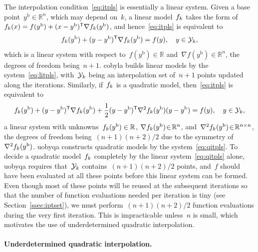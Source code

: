 \documentclass[
    smallextended,  %
    final,        %
]{svjour3}
\newcommand{\R}{\mathbb{R}}
\newcommand{\T}{\mathsf{T}}
\newcommand{\base}{{\text{b}}}
\newcommand{\objm}[1][k]{\obj\ifthenelse{\equal{#1}{}}{}{_{#1}}}
\newcommand{\obj}{f}
\newcommand{\xpt}[1][k]{\mathcal{Y}\ifthenelse{\equal{#1}{}}{}{_{#1}}}
\begin{document}
The interpolation condition~\eqref{eq:itpls} is essentially a linear system.
Given a base point~$y^{\base}\in \R^n$, which may depend on~$k$, a linear model~$\objm$ takes the
form of~$\objm(x) = \obj(y^{\base}) + (x - y^{\base})^{\T} \nabla \objm(y^{\base})$, and
hence~\eqref{eq:itpls} is equivalent to
\begin{equation}
    \label{eq:litpls}
    \objm(y^{\base}) + (y -y^{\base})^{\T} \nabla \objm(y^{\base})  = \obj(y),  \quad y \in \xpt,
\end{equation}
which is a linear system with respect to~$\obj(y^\base) \in \R$ and~$\nabla \obj(y^\base) \in \R^n$, the degrees of freedom being~$n+1$.
\Gls{cobyla} builds linear models by the system~\eqref{eq:litpls}, with~$\xpt$ being an interpolation
set of~$n+1$ points updated along the iterations.
Similarly, if~$\objm$ is a quadratic model, then~\eqref{eq:itpls} is equivalent to
\begin{equation}
    \label{eq:qitpls}
    \objm(y^{\base}) + (y -y^{\base})^{\T} \nabla \objm(y^{\base})
    + \frac{1}{2}(y-y^{\base})^{\T}  \nabla^2 \objm(y^{\base}) (y-y^{\base}) = \obj(y),  \quad y \in \xpt,
\end{equation}
a linear system with unknowns~$\objm(y^\base) \in \R$, $\nabla \objm(y^\base) \!\in\! \R^n$,
and~$\nabla^2 \objm(y^{\base})\!\in\!\R^{n \times n}$, the degrees of freedom being~$(n + 1)(n + 2) / 2$ due to the symmetry of~$\nabla^2 \objm(y^\base)$.
\Gls{uobyqa} constructs quadratic models by the system~\eqref{eq:qitpls}.
To decide a quadratic model~$\objm$ completely by the linear system~\eqref{eq:qitpls} alone,
\gls{uobyqa} requires that~$\xpt$ contains~$(n+1)(n+2)/2$ points, and~$f$ should have been evaluated at all these points before this linear system can be formed.
Even though most of these points will be reused at the subsequent iterations so that the number of
function evaluations needed per iteration is tiny (see Section~\ref{ssec:iptset}), we must perform~$(n + 1)(n + 2) / 2$ function evaluations during the very first iteration.
This is impracticable unless~$n$ is small, which motivates the use of underdetermined quadratic interpolation.

\paragraph{\textnormal{\textbf{Underdetermined quadratic interpolation.}}}
\end{document}
